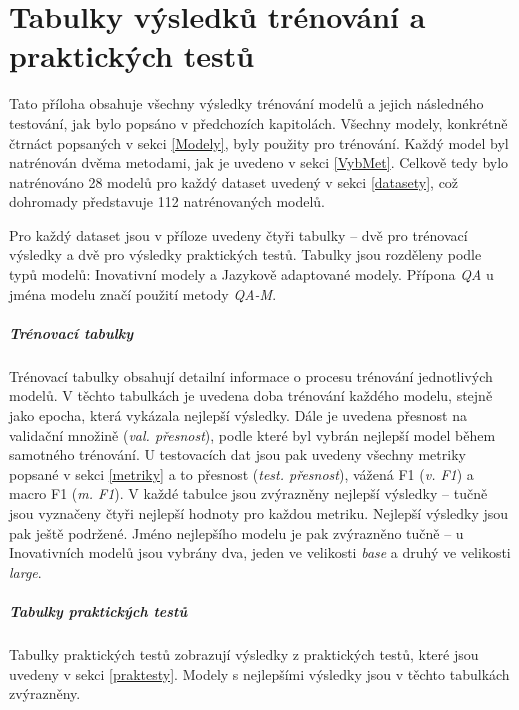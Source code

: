 \chapter{Tabulky výsledků trénování a praktických testů}\label{appendix}
Tato příloha obsahuje všechny výsledky trénování modelů a jejich následného testování, jak bylo popsáno v předchozích kapitolách. Všechny modely, konkrétně čtrnáct popsaných v sekci \ref{Modely}, byly použity pro trénování. Každý model byl natrénován dvěma metodami, jak je uvedeno v sekci \ref{VybMet}. Celkově tedy bylo natrénováno 28 modelů pro každý dataset uvedený v sekci \ref{datasety}, což dohromady představuje 112 natrénovaných modelů.

Pro každý dataset jsou v příloze uvedeny čtyři tabulky -- dvě pro trénovací výsledky a dvě pro výsledky praktických testů. Tabulky jsou rozděleny podle typů modelů: Inovativní modely a Jazykově adaptované modely. Přípona \emph{QA} u jména modelu značí použití metody \emph{QA-M}.

\paragraph{Trénovací tabulky}  
Trénovací tabulky obsahují detailní informace o procesu trénování jednotlivých modelů. V těchto tabulkách je uvedena doba trénování každého modelu, stejně jako epocha, která vykázala nejlepší výsledky. Dále je uvedena přesnost na validační množině (\emph{val. přesnost}), podle které byl vybrán nejlepší model během samotného trénování. U testovacích dat jsou pak uvedeny všechny metriky popsané v sekci \ref{metriky} a to přesnost (\emph{test. přesnost}), vážená F1 (\emph{v. F1}) a macro F1 (\emph{m. F1}). V každé tabulce jsou zvýrazněny nejlepší výsledky -- tučně jsou vyznačeny čtyři nejlepší hodnoty pro každou metriku. Nejlepší výsledky jsou pak ještě podržené. Jméno nejlepšího modelu je pak zvýrazněno tučně -- u Inovativních modelů jsou vybrány dva, jeden ve velikosti \emph{base} a druhý ve velikosti \emph{large}.

\paragraph{Tabulky praktických testů}  
Tabulky praktických testů zobrazují výsledky z praktických testů, které jsou uvedeny v sekci \ref{praktesty}. Modely s nejlepšími výsledky jsou v těchto tabulkách zvýrazněny.


